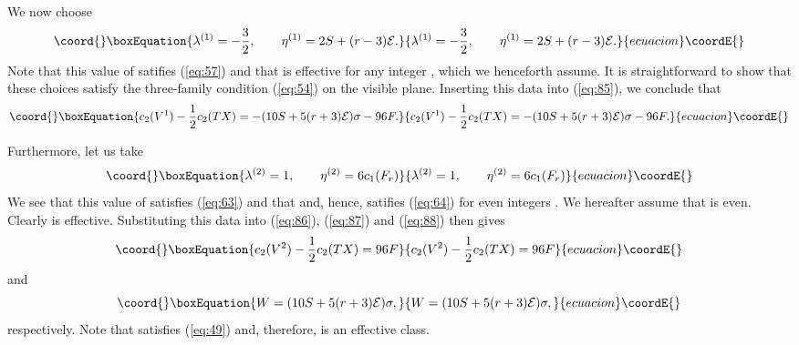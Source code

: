 \documentclass[a4paper,12pt]{article}
\numberwithin{equation}{section}
\theoremstyle{plain}
\begin{document}
We now choose
%
\begin{equation}\coord{}\boxEquation{
\lambda^{(1)}=-\frac{3}{2}, \qquad \eta^{(1)}=2S+(r-3){\cal{E}}.
\label{eq:90}
}{
\lambda^{(1)}=-\frac{3}{2}, \qquad \eta^{(1)}=2S+(r-3){\cal{E}}.
}{ecuacion}\coordE{}\end{equation}
%
Note that this value of \coordHE{} satifies (\ref{eq:57}) and that
\coordHE{} is effective for any integer \coordHE{}, which we 
henceforth assume. It is straightforward to
show that these choices satisfy the three-family condition (\ref{eq:54}) on
the visible plane. Inserting this data into (\ref{eq:85}), we conclude that
%
\begin{equation}\coord{}\boxEquation{
c_{2}(V^{1})-\frac{1}{2}c_{2}(TX)=-(10S+5(r+3){\cal{E}})\sigma-96F.
\label{eq:91}
}{
c_{2}(V^{1})-\frac{1}{2}c_{2}(TX)=-(10S+5(r+3){\cal{E}})\sigma-96F.
}{ecuacion}\coordE{}\end{equation}
%


Furthermore, let us take
%
\begin{equation}\coord{}\boxEquation{
\lambda^{(2)}=1, \qquad \eta^{(2)}=6c_{1}(F_{r})
\label{eq:92}
}{
\lambda^{(2)}=1, \qquad \eta^{(2)}=6c_{1}(F_{r})
}{ecuacion}\coordE{}\end{equation}
%
We see that this value of \coordHE{} satisfies (\ref{eq:63}) and that
\coordHE{} and, hence, satifies
(\ref{eq:64}) for even integers \coordHE{}. We hereafter assume that \coordHE{} is even. 
Clearly \coordHE{} is effective. Substituting this
data into (\ref{eq:86}), (\ref{eq:87}) and (\ref{eq:88}) then gives
%
\begin{equation}\coord{}\boxEquation{
c_{2}(V^{2})-\frac{1}{2}c_{2}(TX)=96F
\label{eq:93}
}{
c_{2}(V^{2})-\frac{1}{2}c_{2}(TX)=96F
}{ecuacion}\coordE{}\end{equation}
%
and
%
\begin{equation}\coord{}\boxEquation{
W=(10S+5(r+3){\cal{E}})\sigma,
\label{eq:94}
}{
W=(10S+5(r+3){\cal{E}})\sigma,
}{ecuacion}\coordE{}\end{equation}
%
respectively. Note that \coordHE{} satisfies (\ref{eq:49}) and, therefore, is an
effective class.
\end{document}
